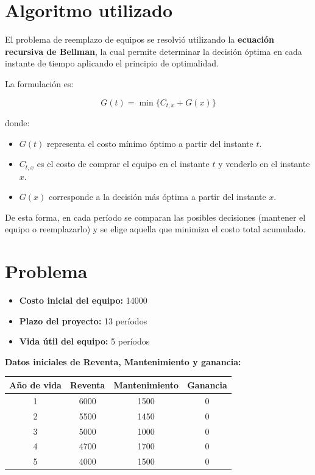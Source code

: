 \documentclass[12pt]{article}
\begin{document}
\bigskip
\section*{Algoritmo utilizado}
El problema de reemplazo de equipos se resolvió utilizando la \textbf{ecuación recursiva de Bellman}, la cual permite determinar la decisión óptima en cada instante de tiempo aplicando el principio de optimalidad. 

La formulación es:

$$
G(t) = \min \{ C_{t,x} + G(x) \}
$$

donde:
\begin{itemize}
  \item $G(t)$ representa el costo mínimo óptimo a partir del instante $t$.
  \item $C_{t,x}$ es el costo de comprar el equipo en el instante $t$ y venderlo en el instante $x$.
  \item $G(x)$ corresponde a la decisión más óptima a partir del instante $x$.
\end{itemize}

De esta forma, en cada período se comparan las posibles decisiones (mantener el equipo o reemplazarlo) y se elige aquella que minimiza el costo total acumulado.

\bigskip
\section*{Problema}
\begin{itemize}
\item \textbf{Costo inicial del equipo:} 14000
\item \textbf{Plazo del proyecto:} 13 períodos
\item \textbf{Vida útil del equipo:} 5 períodos
\end{itemize}

\textbf{Datos iniciales de Reventa, Mantenimiento y ganancia:} 
\begin{table}[h!]
\centering
\begin{tabular}{|c|c|c|c|}
\hline
\textbf{Año de vida} & \textbf{Reventa} & \textbf{Mantenimiento} & \textbf{Ganancia} \\
\hline
1 & 6000 & 1500 & 0 \\
\hline
2 & 5500 & 1450 & 0 \\
\hline
3 & 5000 & 1000 & 0 \\
\hline
4 & 4700 & 1700 & 0 \\
\hline
5 & 4000 & 1500 & 0 \\
\hline
\end{tabular}
\end{table}
\end{document}
